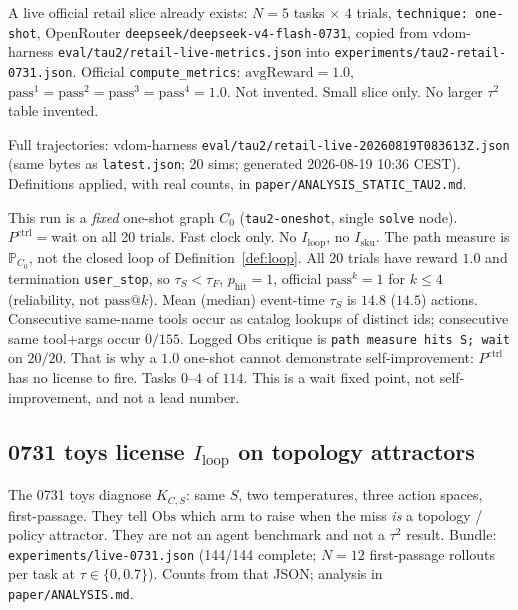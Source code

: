 \documentclass{article}
\begin{document}
A live official retail slice already exists: \(N=5\) tasks \(\times\) \(4\) trials, \texttt{technique: one-shot}, OpenRouter \texttt{deepseek/deepseek-v4-flash-0731}, copied from vdom-harness \texttt{eval/tau2/retail-live-metrics.json} into \texttt{experiments/tau2-retail-0731.json}. Official \texttt{compute\_metrics}: \(\mathrm{avgReward}=1.0\), \(\mathrm{pass}^1=\mathrm{pass}^2=\mathrm{pass}^3=\mathrm{pass}^4=1.0\). Not invented. Small slice only. No larger \(\tau^2\) table invented.

Full trajectories: vdom-harness \texttt{eval/tau2/retail-live-20260819T083613Z.json} (same bytes as \texttt{latest.json}; 20 sims; generated 2026-08-19 10:36 CEST). Definitions applied, with real counts, in \texttt{paper/ANALYSIS\_STATIC\_TAU2.md}.

This run is a \emph{fixed} one-shot graph \(C_0\) (\texttt{tau2-oneshot}, single \texttt{solve} node). \(P^{\mathrm{ctrl}}=\mathrm{wait}\) on all 20 trials. Fast clock only. No \(I_{\mathrm{loop}}\), no \(I_{\mathrm{sku}}\). The path measure is \(\mathbb{P}_{C_0}\), not the closed loop of Definition~\ref{def:loop}. All 20 trials have reward \(1.0\) and termination \texttt{user\_stop}, so \(\tau_S<\tau_F\), \(p_{\mathrm{hit}}=1\), official \(\mathrm{pass}^k=1\) for \(k\le 4\) (reliability, not \(\mathrm{pass}@k\)). Mean (median) event-time \(\tau_S\) is \(14.8\) (\(14.5\)) actions. Consecutive same-name tools occur as catalog lookups of distinct ids; consecutive same tool+args occur \(0/155\). Logged \(\mathrm{Obs}\) critique is \texttt{path measure hits S; wait} on \(20/20\). That is why a \(1.0\) one-shot cannot demonstrate self-improvement: \(P^{\mathrm{ctrl}}\) has no license to fire. Tasks \(0\)--\(4\) of \(114\). This is a wait fixed point, not self-improvement, and not a lead number.

\subsection{0731 toys license \(I_{\mathrm{loop}}\) on topology attractors}
\label{sec:diag}

The 0731 toys diagnose \(K_{C,S}\): same \(S\), two temperatures, three action spaces, first-passage. They tell \(\mathrm{Obs}\) which arm to raise when the miss \emph{is} a topology / policy attractor. They are not an agent benchmark and not a \(\tau^2\) result. Bundle: \texttt{experiments/live-0731.json} (144/144 complete; \(N=12\) first-passage rollouts per task at \(\tau\in\{0,0.7\}\)). Counts from that JSON; analysis in \texttt{paper/ANALYSIS.md}.
\end{document}
